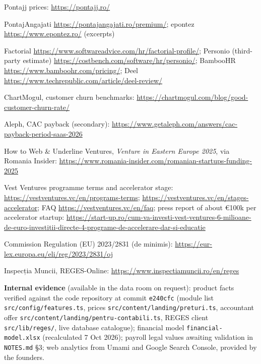 \documentclass[10pt,a4paper]{article}
\newcommand{\fisier}[1]{\nolinkurl{#1}}
\begin{document}
{\begin{enumerate}[label={[\arabic*]},leftmargin=2.2em,itemsep=1.5pt]
\item Pontajj prices: \url{https://pontajj.ro/}
\item PontajAngajati \url{https://pontajangajati.ro/premium/}; epontez \url{https://www.epontez.ro/} (excerpts)
\item Factorial \url{https://www.softwareadvice.com/hr/factorial-profile/}; Personio (third-party estimate) \url{https://costbench.com/software/hr/personio/}; BambooHR \url{https://www.bamboohr.com/pricing/}; Deel \url{https://www.techrepublic.com/article/deel-review/}
\item ChartMogul, customer churn benchmarks: \url{https://chartmogul.com/blog/good-customer-churn-rate/}
\item Aleph, CAC payback (secondary): \url{https://www.getaleph.com/answers/cac-payback-period-saas-2026}
\item How to Web \& Underline Ventures, \textit{Venture in Eastern Europe 2025}, via Romania Insider: \url{https://www.romania-insider.com/romanian-startups-funding-2025}
\item Vest Ventures programme terms and accelerator stage: \url{https://vestventures.vc/en/programs-terms}; \url{https://vestventures.vc/en/stages-accelerator}; FAQ \url{https://vestventures.vc/en/faq}; press report of about €100k per accelerator startup: \url{https://start-up.ro/cum-va-investi-vest-ventures-6-milioane-de-euro-investitii-directe-4-programe-de-accelerare-dar-si-educatie}
\item Commission Regulation (EU) 2023/2831 (de minimis): \url{https://eur-lex.europa.eu/eli/reg/2023/2831/oj}
\item Inspecția Muncii, REGES-Online: \url{https://www.inspectiamuncii.ro/en/reges}
\end{enumerate}

\textbf{Internal evidence} (available in the data room on request): product facts verified against the
code repository at commit \fisier{e240cfc} (module list \fisier{src/config/features.ts}, prices
\fisier{src/content/landing/preturi.ts}, accountant offer \fisier{src/content/landing/pentru-contabili.ts},
REGES client \fisier{src/lib/reges/}, live database catalogue); financial model
\fisier{financial-model.xlsx} (recalculated 7 Oct 2026); payroll
legal values awaiting validation in \fisier{NOTES.md} §3; web analytics from Umami and Google Search
Console, provided by the founders.
\par}
\end{document}
